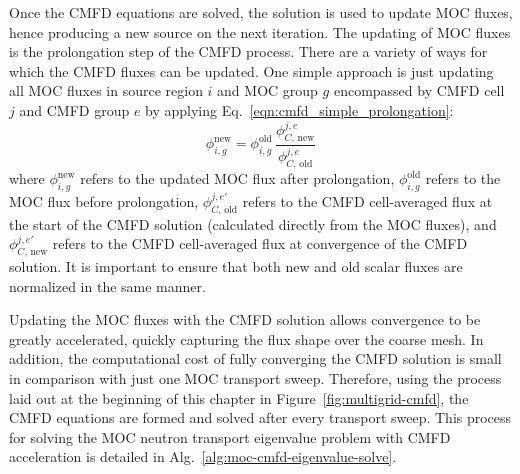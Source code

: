 Once the \ac{CMFD} equations are solved, the solution is used to update \ac{MOC} fluxes, hence producing a new source on the next iteration. The updating of \ac{MOC} fluxes is the prolongation step of the \ac{CMFD} process. There are a variety of ways for which the \ac{CMFD} fluxes can be updated. One simple approach is just updating all \ac{MOC} fluxes in source region $i$ and \ac{MOC} group $g$ encompassed by \ac{CMFD} cell $j$ and \ac{CMFD} group $e$ by applying Eq.~\ref{eqn:cmfd_simple_prolongation}:
\begin{equation}
\phi_{i,g}^{\text{new}} = \phi_{i,g}^{\text{old}} \, \frac{\phi_{C, \, \text{new}}^{j,e}}{\phi_{C, \, \text{old}}^{j,e}}
\label{eqn:cmfd_simple_prolongation}
\end{equation}
where $\phi_{i,g}^{\text{new}}$ refers to the updated \ac{MOC} flux after prolongation, $\phi_{i,g}^{\text{old}}$ refers to the \ac{MOC} flux before prolongation, $\phi_{C, \, \text{old}}^{j,e'}$ refers to the \ac{CMFD} cell-averaged flux at the start of the \ac{CMFD} solution (calculated directly from the \ac{MOC} fluxes), and $\phi_{C, \, \text{new}}^{j,e'}$ refers to the \ac{CMFD} cell-averaged flux at convergence of the \ac{CMFD} solution. It is important to ensure that both new and old scalar fluxes are normalized in the same manner.

Updating the \ac{MOC} fluxes with the \ac{CMFD} solution allows convergence to be greatly accelerated, quickly capturing the flux shape over the coarse mesh. In addition, the computational cost of fully converging the \ac{CMFD} solution is small in comparison with just one \ac{MOC} transport sweep. Therefore, using the process laid out at the beginning of this chapter in Figure~\ref{fig:multigrid-cmfd}, the \ac{CMFD} equations are formed and solved after every transport sweep. This process for solving the \ac{MOC} neutron transport eigenvalue problem with \ac{CMFD} acceleration is detailed in Alg.~\ref{alg:moc-cmfd-eigenvalue-solve}.

